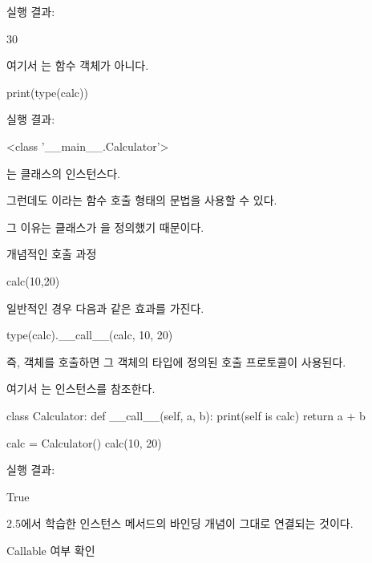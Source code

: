 실행 결과:

\begin{dhkzsh}
30
\end{dhkzsh}

여기서 는 함수 객체가 아니다.

\begin{dhkcode}
print(type(calc))
\end{dhkcode}

실행 결과:

\begin{dhkzsh}
<class '__main__.Calculator'>
\end{dhkzsh}

는  클래스의 인스턴스다.

그런데도 이라는 함수 호출 형태의 문법을 사용할 수 있다.

그 이유는  클래스가 을 정의했기 때문이다.

\begin{dhknote}
\begin{dhksmry}[centered]
개념적인 호출 과정
\end{dhksmry}
\end{dhknote}

\begin{dhkcode}
calc(10,20)
\end{dhkcode}

일반적인 경우 다음과 같은 효과를 가진다.

\begin{dhkcode}
type(calc).__call__(calc, 10, 20)
\end{dhkcode}

즉, 객체를 호출하면 그 객체의 타입에 정의된 호출 프로토콜이 사용된다.

여기서 는  인스턴스를 참조한다.

\begin{dhkcode}
class Calculator:
    def __call__(self, a, b):
        print(self is calc)
        return a + b


calc = Calculator()
calc(10, 20)
\end{dhkcode}

실행 결과:

\begin{dhkzsh}
True
\end{dhkzsh}

2.5에서 학습한 인스턴스 메서드의  바인딩 개념이 그대로 연결되는 것이다.

\begin{dhknote}
\begin{dhksmry}[centered]
Callable 여부 확인
\end{dhksmry}
\end{dhknote}

